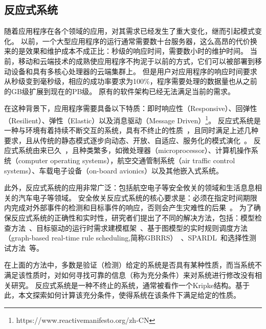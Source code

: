 \subsection{反应式系统}
随着应用程序在各个领域的应用，对其需求已经发生了重大变化，继而引起模式变化。
以前，一个大型应用程序的运行通常需要数十台服务器，这么高昂的代价换来的是效果和维护成本不成正比：秒级的响应时间，需要数小时的维护时间。
当前，移动和云端技术的成熟使应用程序不拘泥于以前的方式，它们可以被部署到移动设备和具有多核心处理器的云端集群上。
但是用户对应用程序的响应时间要求从秒级变到毫秒级，相应的成功率要求为100\%，程序需要处理的数据量也从之前的GB级扩展到现在的PB级。
原有的软件架构已经无法满足当前的需求。

在这种背景下，应用程序需要具备以下特质：即时响应性（Responsive）、回弹性（Resilient）、弹性（Elastic）以及消息驱动（Message Driven）\footnote{https://www.reactivemanifesto.org/zh-CN}。
反应式系统是一种与环境有着持续不断交互的系统，具有不终止的性质~\cite{DBLP:series/txtcs/Schneider04}，且同时满足上述几种要求，且从传统的静态模式逐步向动态、开放、自适应、服务化的模式演化~\cite{jian2012}。
反应式系统由来已久~\cite{DBLP:conf/nato/HarelP84,DBLP:books/sp/trends86/Pnueli86}，且种类繁多，如微处理器（microprocessor）、计算机操作系统（computer operating systems），航空交通管制系统（air traffic control systems）、车载电子设备（on-board avionics）以及其他嵌入式系统。

此外，反应式系统的应用非常广泛：包括航空电子等安全攸关的领域和生活息息相关的汽车电子等领域。
安全攸关反应式系统的核心要求是：必须在指定时间期限内完成对外部事件的检测和目标事件的响应，否则会产生灾难性的后果~\cite{wangjuan2019}。
为了确保反应式系统的正确性和实时性，研究者们提出了不同的解决方法，包括：模型检查方法~\cite{DBLP:books/daglib/0007403,clarke1996model,DBLP:series/txtcs/Schneider04}、目标驱动的运行时需求建模框架~\cite{jian2012}、基于图模型的实时规则调度方法（graph-based real-time rule scheduling,简称GBRRS）~\cite{wangjuan2019}、SPARDL~\cite{wangzhen2012}和选择性测试方法~\cite{lishu2004}等。

在上面的方法中，多数是验证（检测）给定的系统是否具有某种性质，而当系统不满足该性质时，对如何寻找可靠的信息（称为充分条件）来对系统进行修改没有相关研究。
反应式系统是一种不终止的系统，通常被看作一个Kripke结构。基于此，本文探索如何计算该充分条件，使得系统在该条件下满足给定的性质。




